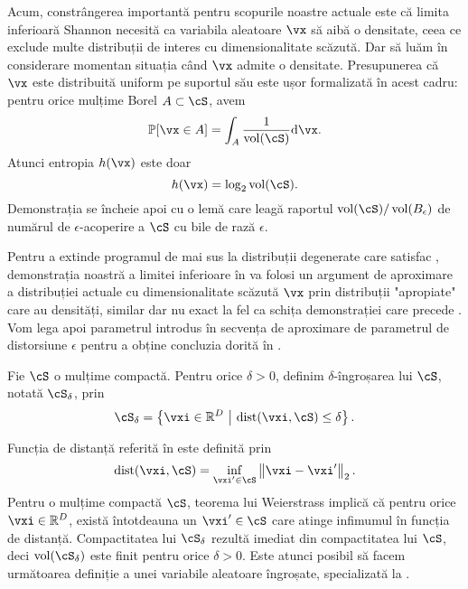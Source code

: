 \documentclass[../../book-main_ro.tex]{subfiles}
\begin{document}
Acum, constrângerea importantă pentru scopurile noastre actuale este că limita inferioară
Shannon necesită ca variabila aleatoare $\vx$ să aibă o densitate, ceea ce exclude multe
distribuții de interes cu dimensionalitate scăzută.
Dar să luăm în considerare momentan situația când $\vx$ admite o densitate.
Presupunerea că $\vx$ este distribuită uniform pe suportul său este ușor
formalizată în acest cadru: pentru orice mulțime Borel $A \subset \cS$, avem
\begin{equation}
    \Pr[\vx \in A] = \int_{A} \frac{1}{\volume(\cS)} \odif \vx.
\end{equation}
Atunci entropia $h(\vx)$ este doar
\begin{equation}
    h(\vx) = \log_2 \volume(\cS).
\end{equation}
Demonstrația se încheie apoi cu o lemă care leagă raportul $\volume(\cS)
/ \volume(B_{\epsilon})$ de numărul de $\epsilon$-acoperire a $\cS$ cu
bile de rază $\epsilon$.


Pentru a extinde programul de mai sus la distribuții degenerate care satisfac
,
demonstrația noastră a limitei inferioare în  va
folosi un argument de aproximare a distribuției actuale cu dimensionalitate
scăzută $\vx$ prin distribuții "apropiate" care au
densități, similar dar nu exact la fel ca schița demonstrației care precede .
Vom lega apoi parametrul introdus în
secvența de aproximare de parametrul de distorsiune $\epsilon$ pentru a
obține concluzia dorită în .


\begin{definition}\label{def:thickening-set}
    Fie $\cS$ o mulțime compactă.
    Pentru orice $\delta > 0$, definim $\delta$-îngroșarea lui $\cS$, notată
    $\cS_{\delta}$, prin
    \begin{equation}
        \cS_{\delta} = \set*{\vxi \in \R^D \given \mathrm{dist}(\vxi, \cS) \leq
        \delta}.
    \end{equation}
\end{definition}
Funcția de distanță referită în  este definită prin
\begin{equation}\label{eq:dist-func}
    \dist(\vxi, \cS) = \inf_{\vxi' \in \cS} \norm*{\vxi - \vxi'}_2.
\end{equation}
Pentru o mulțime compactă $\cS$, teorema lui Weierstrass implică că pentru orice $\vxi \in
\R^D$, există întotdeauna un $\vxi' \in \cS$ care atinge infimumul în funcția de
distanță.
Compactitatea lui $\cS_{\delta}$ rezultă imediat din compactitatea lui $\cS$, deci
$\volume(\cS_{\delta})$ este finit pentru orice $\delta > 0$. Este atunci posibil să
facem următoarea definiție a unei variabile aleatoare îngroșate, specializată la
.
\end{document}
